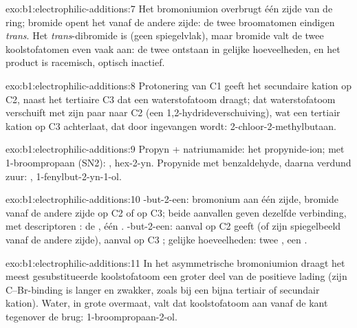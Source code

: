 \begin{solution}{exo:b1:electrophilic-additions:7}
Het bromoniumion overbrugt één zijde van de ring; bromide opent het vanaf
de andere zijde: de twee broomatomen eindigen \textit{trans}. Het
\textit{trans}-dibromide is  (geen spiegelvlak), maar bromide valt
de twee koolstofatomen even vaak aan: de twee  ontstaan in
gelijke hoeveelheden, en het product is racemisch, optisch inactief.
\end{solution}

\begin{solution}{exo:b1:electrophilic-additions:8}
Protonering van C1 geeft het secundaire kation op C2, naast het tertiaire
C3 dat een waterstofatoom draagt; dat waterstofatoom verschuift met zijn
paar naar C2 (een 1,2-hydrideverschuiving), wat een tertiair kation op C3
achterlaat, dat door  ingevangen wordt: 2-chloor-2-methylbutaan.
\end{solution}

\begin{solution}{exo:b1:electrophilic-additions:9}
Propyn + natriumamide: het propynide-ion; met 1-broompropaan (SN2):
, hex-2-yn. Propynide met benzaldehyde, daarna
verdund zuur: , 1-fenylbut-2-yn-1-ol.
\end{solution}

\begin{solution}{exo:b1:electrophilic-additions:10}
-but-2-een: bromonium aan één zijde, bromide vanaf de andere
zijde op C2 of op C3; beide aanvallen geven dezelfde verbinding, met
descriptoren : de , één .
-but-2-een: aanval op C2 geeft  (of zijn spiegelbeeld
vanaf de andere zijde), aanval op C3 ; gelijke hoeveelheden:
twee , een .
\end{solution}

\begin{solution}{exo:b1:electrophilic-additions:11}
In het asymmetrische bromoniumion draagt het meest gesubstitueerde
koolstofatoom een groter deel van de positieve lading (zijn C--Br-binding
is langer en zwakker, zoals bij een bijna tertiair of secundair kation).
Water, in grote overmaat, valt dat koolstofatoom aan vanaf de kant
tegenover de brug: 1-broompropaan-2-ol.
\end{solution}

